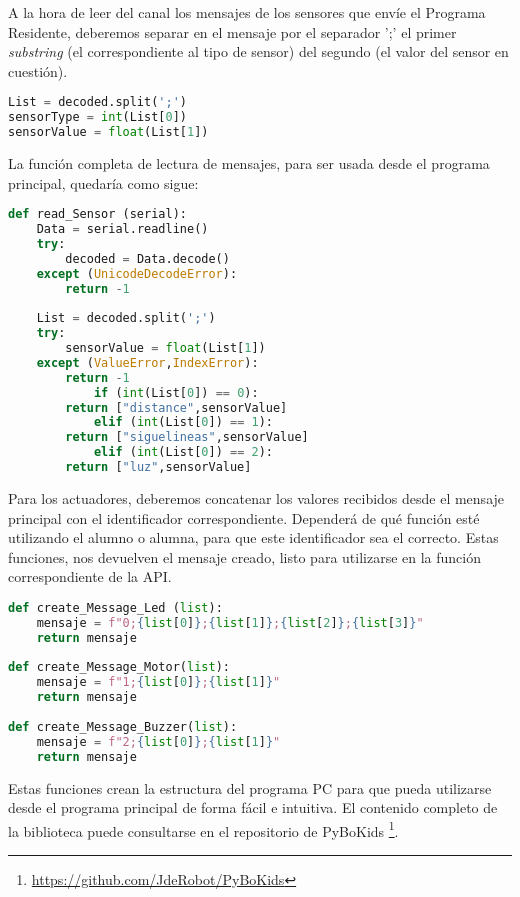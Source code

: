 A la hora de leer del canal los mensajes de los sensores que envíe el Programa Residente, deberemos separar en el mensaje por el separador ';' el primer \textit{substring} (el correspondiente al tipo de sensor) del segundo (el valor del sensor en cuestión).  
\begin{lstlisting}[language=python,caption={Decodificación de un mensaje en Python}]
List = decoded.split(';')
sensorType = int(List[0])
sensorValue = float(List[1])
\end{lstlisting}

La función completa de lectura de mensajes, para ser usada desde el programa principal, quedaría como sigue:

\begin{lstlisting}[language=python,caption={Decodificación de un mensaje en Python}]
def read_Sensor (serial):
	Data = serial.readline()
	try:
		decoded = Data.decode()
	except (UnicodeDecodeError):
		return -1 
	
	List = decoded.split(';')
	try:
		sensorValue = float(List[1])
	except (ValueError,IndexError):
		return -1 
			if (int(List[0]) == 0):
		return ["distance",sensorValue]
			elif (int(List[0]) == 1):
		return ["siguelineas",sensorValue]
			elif (int(List[0]) == 2):
		return ["luz",sensorValue]
\end{lstlisting}


Para los actuadores, deberemos concatenar los valores recibidos desde el mensaje principal con el identificador correspondiente. Dependerá de qué función esté utilizando el alumno o alumna, para que este identificador sea el correcto. Estas funciones, nos devuelven el mensaje creado, listo para utilizarse en la función correspondiente de la API.

\begin{lstlisting}[language=python,caption={Funciones en la biblioteca PC para la codificación de mensajes de los actuadores}]
def create_Message_Led (list):
	mensaje = f"0;{list[0]};{list[1]};{list[2]};{list[3]}"
	return mensaje
	
def create_Message_Motor(list):
	mensaje = f"1;{list[0]};{list[1]}"
	return mensaje
	
def create_Message_Buzzer(list):
	mensaje = f"2;{list[0]};{list[1]}"
	return mensaje
\end{lstlisting}


Estas funciones crean la estructura del programa PC para que pueda utilizarse desde el programa principal de forma fácil e intuitiva. El contenido completo de la biblioteca puede consultarse en el repositorio de PyBoKids  \footnote{\href{https://github.com/JdeRobot/PyBoKids}{https://github.com/JdeRobot/PyBoKids}}.\\


